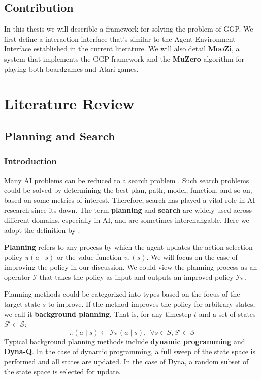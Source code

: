 \documentclass[12pt]{article}
\newcommand{\note}[1]{\todo[color=yellow!40,bordercolor=none,linecolor=black]{~~ #1}}
\begin{document}
\subsection{Contribution}
In this thesis we will describle a framework for solving the problem of GGP.
We first define a interaction interface that's similar to the Agent-Environment Interface established in the current literature.
We will also detail \textbf{MooZi}, a system that implements the GGP framework and the \textbf{MuZero} algorithm for playing both boardgames and Atari games.

\section{Literature Review}
\note{4 - 5 pages}

\subsection{Planning and Search}
\subsubsection{Introduction}
Many AI problems can be reduced to a search problem \cite[p.39]{ArtificialIntelligenceGames_Yannakakis.Togelius_2018}.
Such search problems could be solved by determining the best plan, path, model, function, and so on, based on some metrics of interest.
Therefore, search has played a vital role in AI research since its dawn. The term \note{s?} \textbf{planning} and \textbf{search} are widely used across different domains, especially in AI,
and are sometimes interchangable.
Here we adopt the definition by \citeauthor{ReinforcementLearningIntroduction_Sutton.Barto_2018} \cite{ReinforcementLearningIntroduction_Sutton.Barto_2018}.

\textbf{Planning} refers to any process by which the agent updates the action selection policy $\pi(a \mid s)$ or the value function $v_\pi(s)$.
We will focus on the case of improving the policy in our discussion.
We could view the planning process as an operator $\mathcal{I}$ that takes the policy as input and outputs an improved policy $\mathcal{I}\pi$.

Planning methods could be categorized into types based on the focus of the target state $s$ to improve.
If the method improves the policy for arbitrary states, we call it \textbf{background planning}.
That is, for any timestep $t$ and a set of states $S' \subset \mathcal{S}$:
$$\pi(a \mid s) \leftarrow \mathcal{I}\pi(a \mid s), ~~ \forall s \in S,  S' \subset \mathcal{S}$$
Typical background planning methods include \textbf{dynamic programming} and \textbf{Dyna-Q}.
In the case of dynamic programming, a full sweep of the state space is performed and all states are updated.
In the case of Dyna, a random subset of the state space is selected for update.
\end{document}
